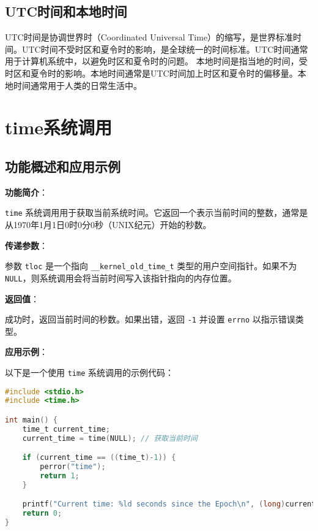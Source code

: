 \documentclass[12pt,hyperref,a4paper,UTF8]{ctexart}
\begin{document}
\subsection{UTC时间和本地时间}
UTC时间是协调世界时（Coordinated Universal Time）的缩写，是世界标准时间。UTC时间不受时区和夏令时的影响，是全球统一的时间标准。UTC时间通常用于计算机系统中，以避免时区和夏令时的问题。
本地时间是指当地的时间，受时区和夏令时的影响。本地时间通常是UTC时间加上时区和夏令时的偏移量。本地时间通常用于人类的日常生活中。

\section{time系统调用}
\subsection{功能概述和应用示例}

\textbf{功能简介}：

\lstinline|time| 系统调用用于获取当前系统时间。它返回一个表示当前时间的整数，通常是从1970年1月1日0时0分0秒（UNIX纪元）开始的秒数。

\textbf{传递参数}：

参数 \lstinline|tloc| 是一个指向 \lstinline|__kernel_old_time_t| 类型的用户空间指针。如果不为 \lstinline|NULL|，则系统调用会将当前时间写入该指针指向的内存位置。

\textbf{返回值}：

成功时，返回当前时间的秒数。如果出错，返回 \lstinline|-1| 并设置 \lstinline|errno| 以指示错误类型。

\textbf{应用示例}：

以下是一个使用 \lstinline|time| 系统调用的示例代码：

\begin{lstlisting}[language=C]
#include <stdio.h>
#include <time.h>

int main() {
    time_t current_time;
    current_time = time(NULL); // 获取当前时间

    if (current_time == ((time_t)-1)) {
        perror("time");
        return 1;
    }

    printf("Current time: %ld seconds since the Epoch\n", (long)current_time);
    return 0;
}
\end{lstlisting}
\end{document}

